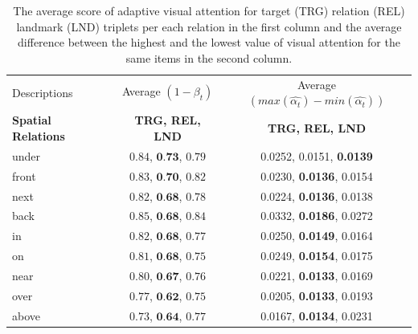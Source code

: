 \begin{table}[ht]
    \centering
    \begin{tabular}{|l|c|c|}
      \hline
        Descriptions
        & Average $(1-\beta_t)$
        & Average $(max(\hat{\alpha_t})-min(\hat{\alpha_t}))$ \\
        \textbf{Spatial Relations}
        &\textbf{TRG, REL, LND }
        &\textbf{TRG, REL, LND} \\
        \hline
        under
        & $0.84$, $\textbf{0.73}$, $ 0.79$ & 0.0252, 0.0151, \textbf{0.0139} \\
        front
        & $0.83$, $\textbf{0.70}$, $ 0.82$ & 0.0230, \textbf{0.0136}, 0.0154 \\
        next
        & $0.82$, $\textbf{0.68}$, $0.78$ & 0.0224, \textbf{0.0136}, 0.0138 \\
        back
        & $0.85$, $\textbf{0.68}$, $0.84$ & 0.0332, \textbf{0.0186}, 0.0272 \\
        in
        & $0.82$, $\textbf{0.68}$, $0.77$ & 0.0250, \textbf{0.0149}, 0.0164 \\
        on
        & $0.81$, $\textbf{0.68}$, $0.75$ & 0.0249, \textbf{0.0154}, 0.0175 \\
        near
        & $0.80$, $\textbf{0.67}$, $0.76$ & 0.0221, \textbf{0.0133}, 0.0169 \\
        over
        & $0.77$, $\textbf{0.62}$, $0.75$ & 0.0205, \textbf{0.0133}, 0.0193 \\
        above
        & $0.73$, $\textbf{0.64}$, $0.77$ & 0.0167, \textbf{0.0134}, 0.0231 \\
        \hline
    \end{tabular}
	\vspace{0.5em}
    \caption{
	The average score of adaptive visual attention for target (TRG) relation
	(REL) landmark (LND) triplets per each relation in the first column and
	the average difference between the highest and the lowest value of visual
	attention for the same items in the second column.}
	\label{sivl2018:tab:spatialkey}
\end{table}


